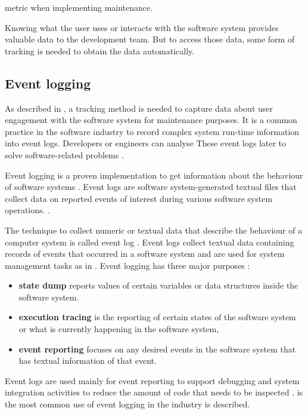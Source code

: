 metric when implementing maintenance.\par Knowing what the user uses or interacts with the software system provides valuable data to the development team. But to access those data, some form of tracking is needed to obtain the data automatically.


\clearpage

\subsection{Event logging}\label{sec:ch1_eventLogging}
As described in , a tracking method is needed to capture data about user engagement with the software system for maintenance purposes. It is a common practice in the software industry to record complex system run-time information into event logs. Developers or engineers can analyse These event logs later to solve software-related problems \cite{Zhu2019}. \par Event logging is a proven implementation to get information about the behaviour of software systems \cite{Baccanico2014}. Event logs are software system-generated textual files that collect data on reported events of interest during various software system operations. \cite{Cinque2013, Baccanico2014}.\par The technique to collect numeric or textual data that describe the behaviour of a computer system is called event log \cite{Pecchia2015, Baccanico2014}. Event logs collect textual data containing records of events that occurred in a software system and are used for system management tasks as in  \cite{Rong2018a, Rong2018, Baccanico2014}. Event logging has three major purposes \cite{Pecchia2015, Baccanico2014}:

\begin{itemize}
	\item \textbf{state dump} reports values of certain variables or data structures inside the software system.
	\item \textbf{execution tracing} is the reporting of certain states of the software system or what is currently happening in the software system,
	\item \textbf{event reporting} focuses on any desired events in the software system that has textual information of that event.
\end{itemize}

Event logs are used mainly for event reporting to support debugging and system integration activities to reduce the amount of code that needs to be inspected \cite{Baccanico2014}.  is the most common use of event logging in the industry is described.

